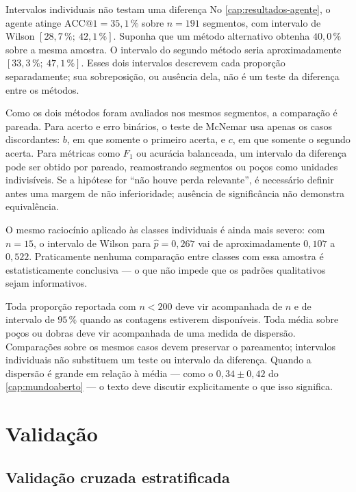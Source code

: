 \begin{exemplo}{Intervalos individuais não testam uma diferença}
No \cref{cap:resultados-agente}, o agente atinge $\text{ACC}@1 = 35{,}1\,\%$ sobre
$n = 191$ segmentos, com intervalo de Wilson $[28{,}7\,\%;\ 42{,}1\,\%]$. Suponha que
um método alternativo obtenha $40{,}0\,\%$ sobre a mesma amostra. O intervalo do
segundo método seria aproximadamente $[33{,}3\,\%;\ 47{,}1\,\%]$. Esses dois
intervalos descrevem cada proporção separadamente; sua sobreposição, ou ausência dela,
não é um teste da diferença entre os métodos.

Como os dois métodos foram avaliados nos mesmos segmentos, a comparação é pareada. Para
acerto e erro binários, o teste de McNemar usa apenas os casos discordantes: $b$, em que
somente o primeiro acerta, e $c$, em que somente o segundo acerta. Para métricas como
$F_1$ ou acurácia balanceada, um intervalo da diferença pode ser obtido por
 pareado, reamostrando segmentos ou poços como unidades indivisíveis.
Se a hipótese for ``não houve perda relevante'', é necessário definir antes uma margem
de não inferioridade; ausência de significância não demonstra equivalência.

O mesmo raciocínio aplicado às classes individuais é ainda mais severo: com $n = 15$,
o intervalo de Wilson para $\hat{p} = 0{,}267$ vai de aproximadamente $0{,}107$ a
$0{,}522$. Praticamente nenhuma comparação entre classes com essa amostra é
estatisticamente conclusiva --- o que não impede que os padrões qualitativos sejam
informativos.
\end{exemplo}

\begin{destaque}
Toda proporção reportada com $n < 200$ deve vir acompanhada de $n$ e de intervalo de
$95\,\%$ quando as contagens estiverem disponíveis. Toda média sobre poços ou dobras
deve vir acompanhada de uma medida de dispersão. Comparações sobre os mesmos casos devem
preservar o pareamento; intervalos individuais não substituem um teste ou intervalo da
diferença. Quando a dispersão é grande em relação à média --- como o
$0{,}34 \pm 0{,}42$ do \cref{cap:mundoaberto} --- o texto deve discutir explicitamente
o que isso significa.
\end{destaque}

\section{Validação}

\subsection{Validação cruzada estratificada}

